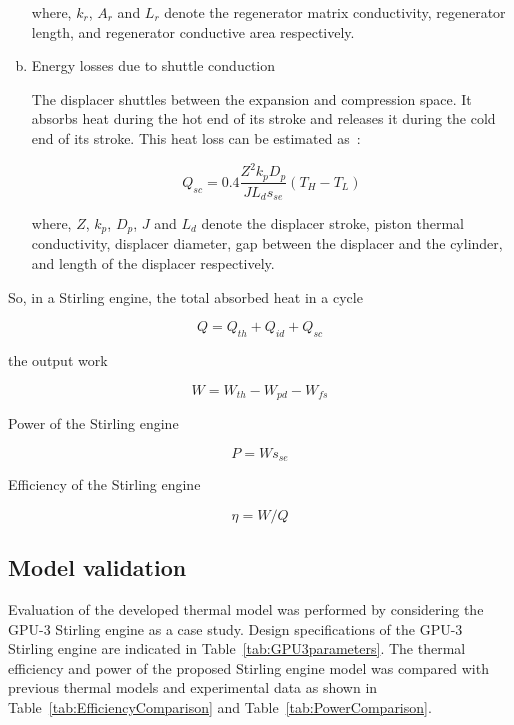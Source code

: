 \documentclass[review,3p,10t]{elsarticle}
\begin{document}
\begin{enumerate}[a.]
where, $k_r$, $A_r$ and $L_r$ denote the regenerator matrix conductivity, regenerator length, and regenerator conductive area respectively.

\item Energy losses due to shuttle conduction

The displacer shuttles between the expansion and compression space. It absorbs heat during the hot end of its stroke and releases it during the cold end of its stroke. This heat loss can be estimated as~\cite{Timoumi2008}:

\begin{equation}
	Q_{sc} = 0.4\frac{Z^2k_pD_p}{JL_ds_{se}}(T_{H} - T_{L})
\end{equation}

where, $Z$, $k_p$, $D_p$, $J$ and $L_d$ denote the displacer stroke, piston thermal conductivity, displacer diameter, gap between the displacer and the cylinder, and length of the displacer respectively.

\end{enumerate}

So, in a Stirling engine, the total absorbed heat in a cycle

\begin{equation}
	Q = Q_{th} + Q_{id} + Q_{sc}
\end{equation}

the output work

\begin{equation}
	W = W_{th} - W_{pd} - W_{fs}
\end{equation}

Power of the Stirling engine

\begin{equation}
	P = Ws_{se}
	\label{Eq:P}
\end{equation}

Efficiency of the Stirling engine

\begin{equation}
	\eta = W/Q
	\label{Eq:eta}
\end{equation}


\subsection{Model validation~\label{sec:modelValidation}}

Evaluation of the developed thermal model was performed by considering the GPU-3 Stirling engine as a case study. Design specifications of the GPU-3 Stirling engine are indicated in Table~\ref{tab:GPU3parameters}. The thermal efficiency and power of the proposed Stirling engine model was compared with previous thermal models and experimental data as shown in Table~\ref{tab:EfficiencyComparison} and Table~\ref{tab:PowerComparison}.
\end{document}
